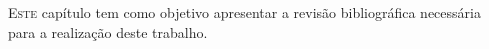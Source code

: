 
  \lettrine{E}{ste} capítulo tem como objetivo apresentar a revisão bibliográfica necessária para a realização deste trabalho.

